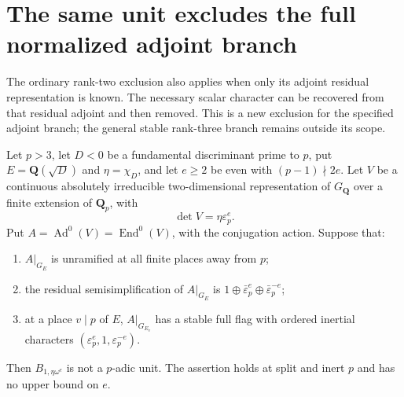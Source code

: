 \section{The same unit excludes the full normalized adjoint branch}
\label{sec:kt-adjoint-unit-exclusion}

The ordinary rank-two exclusion also applies when
only its adjoint residual representation is known.
The necessary scalar character can be recovered
from that residual adjoint and then removed.  This
is a new exclusion for the specified adjoint
branch; the general stable rank-three branch
remains outside its scope.

\begin{theorem}
Let $p>3$, let $D<0$ be a fundamental discriminant
prime to $p$, put $E=\mathbf Q(\sqrt D)$ and
$\eta=\chi_D$, and let $e\ge2$ be even with
$(p-1)\nmid2e$.  Let $V$ be a continuous absolutely
irreducible two-dimensional representation of
$G_{\mathbf Q}$ over a finite extension of
$\mathbf Q_p$, with
\[
                  \det V=\eta\varepsilon_p^e.             \tag{AJ.1}
\]
Put $A=\operatorname{Ad}^0(V)=\operatorname{End}^0(V)$,
with the conjugation action.  Suppose that:
\begin{enumerate}
\item $A|_{G_E}$ is unramified at all finite places
      away from $p$;
\item the residual semisimplification of $A|_{G_E}$ is
      $1\oplus\bar\varepsilon_p^e
                  \oplus\bar\varepsilon_p^{-e}$;
\item at a place $v\mid p$ of $E$, $A|_{G_{E_v}}$
      has a stable full flag with ordered inertial
      characters
      $(\varepsilon_p^e,1,\varepsilon_p^{-e})$.
\end{enumerate}
Then $B_{1,\eta\omega^e}$ is not a $p$-adic unit.
The assertion holds at split and inert $p$ and
has no upper bound on $e$.
\end{theorem}

